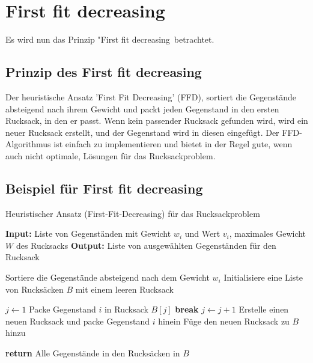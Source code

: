 \documentclass[12pt]{report}
\begin{document}
\newpage
\chapter{First fit decreasing}
Es wird nun das Prinzip "First fit decreasing\dq \, betrachtet.
\section{Prinzip des First fit decreasing}
Der heuristische Ansatz 'First Fit Decreasing' (FFD), sortiert die Gegenstände absteigend nach ihrem Gewicht und packt jeden Gegenstand in den ersten Rucksack, in den er passt. Wenn kein passender Rucksack gefunden wird, wird ein neuer Rucksack erstellt, und der Gegenstand wird in diesen eingefügt. Der FFD-Algorithmus ist einfach zu implementieren und bietet in der Regel gute, wenn auch nicht optimale, Lösungen für das Rucksackproblem. \cite{martello1987algorithms}

\section{Beispiel für First fit decreasing}
\begin{algorithm}
	\caption{Heuristischer Ansatz (First-Fit-Decreasing) für das Rucksackproblem}
	\begin{algorithmic}[1]
		\State \textbf{Input:} Liste von Gegenständen mit Gewicht $w_i$ und Wert $v_i$, maximales Gewicht $W$ des Rucksacks
		\State \textbf{Output:} Liste von ausgewählten Gegenständen für den Rucksack
		
		\State Sortiere die Gegenstände absteigend nach dem Gewicht $w_i$
		\State Initialisiere eine Liste von Rucksäcken $B$ mit einem leeren Rucksack
		
		\State $j \gets 1$
		\State Packe Gegenstand $i$ in Rucksack $B[j]$
		\State \textbf{break}
		\EndIf
		\State $j \gets j + 1$
		\EndWhile
		\State Erstelle einen neuen Rucksack und packe Gegenstand $i$ hinein
		\State Füge den neuen Rucksack zu $B$ hinzu
		\EndIf
		\EndFor
		
		\State \textbf{return} Alle Gegenstände in den Rucksäcken in $B$
	\end{algorithmic}
\end{algorithm}

\end{document}
